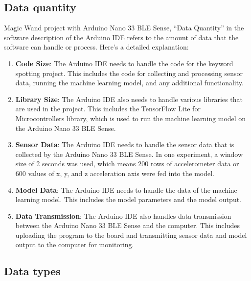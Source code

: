 \subsection{Data quantity}
Magic Wand project with Arduino Nano 33 BLE Sense, “Data Quantity” in the software description of the Arduino IDE refers to the amount of data that the software can handle or process. Here’s a detailed explanation:
\begin{enumerate}
	\item \textbf{Code Size}: The Arduino IDE needs to handle the code for the keyword spotting project. This includes the code for collecting and processing sensor data, running the machine learning model, and any additional functionality.
	
	\item \textbf{Library Size}: The Arduino IDE also needs to handle various libraries that are used in the project. This includes the TensorFlow Lite for Microcontrollers library, which is used to run the machine learning model on the Arduino Nano 33 BLE Sense.
	
	\item \textbf{Sensor Data}: The Arduino IDE needs to handle the sensor data that is collected by the Arduino Nano 33 BLE Sense. In one experiment, a window size of 2 seconds was used, which means 200 rows of accelerometer data or 600 values of x, y, and z acceleration axis were fed into the model.\cite{Fezari:2018}
	
	\item \textbf{Model Data}: The Arduino IDE needs to handle the data of the machine learning model. This includes the model parameters and the model output.
	
	\item \textbf{Data Transmission}: The Arduino IDE also handles data transmission between the Arduino Nano 33 BLE Sense and the computer. This includes uploading the program to the board and transmitting sensor data and model output to the computer for monitoring.
\end{enumerate}

\subsection{Data types}

